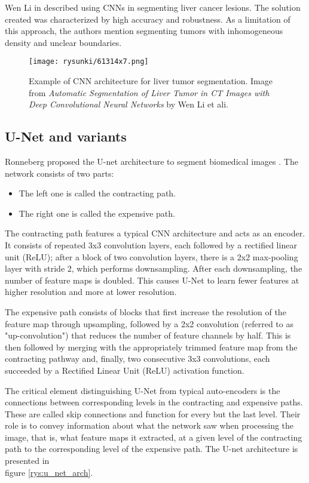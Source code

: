 Wen Li in \cite{li_automatic_2015} described using CNNs in segmenting liver cancer lesions. The solution created was characterized by high accuracy and robustness. As a limitation of this approach, the authors mention segmenting tumors with inhomogeneous density and unclear boundaries.


\begin{figure}[!h]
	\centering \texttt{[image: rysunki/61314x7.png]}
	\caption{Example of CNN architecture for liver tumor segmentation. Image from \textit{Automatic Segmentation of Liver Tumor in CT Images with Deep Convolutional Neural Networks} by Wen Li et ali.}
	\label{rys:cnn_arch}
\end{figure}

\subsection{U-Net and variants}

Ronneberg proposed the U-net architecture to segment biomedical images \cite{navab_u-net_2015}. The network consists of two parts: 
\begin{itemize}
    \item The left one is called the contracting path. 
    \item The right one is called the expensive path.
\end{itemize}
\label{ref:u-net}

The contracting path features a typical CNN architecture and acts as an encoder. It consists of repeated 3x3 convolution layers, each followed by a rectified linear unit (ReLU); after a block of two convolution layers, there is a 2x2 max-pooling layer with stride 2, which performs downsampling. After each downsampling, the number of feature maps is doubled. This causes U-Net to learn fewer features at higher resolution and more at lower resolution. 

The expensive path consists of blocks that first increase the resolution of the feature map through upsampling, followed by a 2x2 convolution (referred to as "up-convolution") that reduces the number of feature channels by half. This is then followed by merging with the appropriately trimmed feature map from the contracting pathway and, finally, two consecutive 3x3 convolutions, each succeeded by a Rectified Linear Unit (ReLU) activation function.

The critical element distinguishing U-Net from typical auto-encoders is the connections between corresponding levels in the contracting and expensive paths. These are called skip connections and function for every but the last level. Their role is to convey information about what the network saw when processing the image, that is, what feature maps it extracted, at a given level of the contracting path to the corresponding level of the expensive path. The U-net architecture is presented in \\ figure \ref{rys:u_net_arch}.

